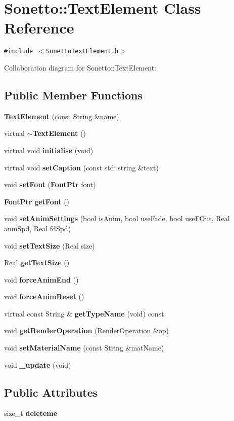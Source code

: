 \section{Sonetto::TextElement Class Reference}
\label{class_sonetto_1_1_text_element}
{\tt \#include $<$SonettoTextElement.h$>$}

Collaboration diagram for Sonetto::TextElement:\subsection*{Public Member Functions}
\begin{CompactItemize}
\item 
{\bf TextElement} (const String \&name)
\item 
virtual {\bf $\sim$TextElement} ()
\item 
virtual void {\bf initialise} (void)
\item 
virtual void {\bf setCaption} (const std::string \&text)
\item 
void {\bf setFont} ({\bf FontPtr} font)
\item 
{\bf FontPtr} {\bf getFont} ()
\item 
void {\bf setAnimSettings} (bool isAnim, bool useFade, bool useFOut, Real anmSpd, Real fdSpd)
\item 
void {\bf setTextSize} (Real size)
\item 
Real {\bf getTextSize} ()
\item 
void {\bf forceAnimEnd} ()
\item 
void {\bf forceAnimReset} ()
\item 
virtual const String \& {\bf getTypeName} (void) const 
\item 
void {\bf getRenderOperation} (RenderOperation \&op)
\item 
void {\bf setMaterialName} (const String \&matName)
\item 
void {\bf \_\-update} (void)
\end{CompactItemize}
\subsection*{Public Attributes}
\begin{CompactItemize}
\item 
size\_\-t {\bf deleteme}
\end{CompactItemize}
